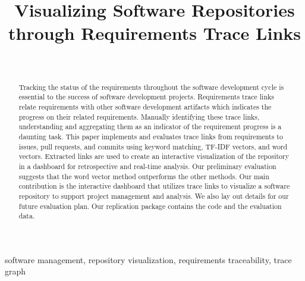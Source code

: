 \documentclass[conference]{IEEEtran}
\begin{document}
\title{Visualizing Software Repositories through Requirements Trace Links}

\author{
  \\
}


\maketitle
\begin{abstract}
  Tracking the status of the requirements throughout the software development cycle is essential to the success of software development projects.
  Requirements trace links relate requirements with other software development artifacts which indicates the progress on their related requirements. Manually identifying these trace links, understanding and aggregating them as an indicator of the requirement progress is a daunting task.
  This paper implements and evaluates trace links from requirements to issues, pull requests, and commits using keyword matching, TF-IDF vectors, and word vectors. Extracted links are used to create an interactive visualization of the repository in a dashboard for retrospective and real-time analysis.
  Our preliminary evaluation suggests that the word vector method outperforms the other methods.
  Our main contribution is the interactive dashboard that utilizes trace links to visualize a software repository to support project management and analysis. We also lay out details for our future evaluation plan. Our replication package contains the code and the evaluation data.

\end{abstract}
\begin{IEEEkeywords}
  software management, repository visualization, requirements traceability, trace graph
\end{IEEEkeywords}













\end{document}
